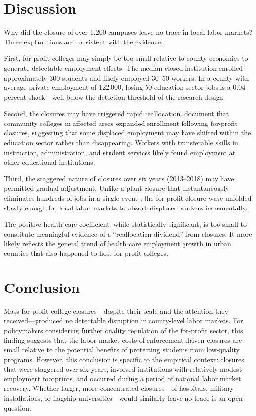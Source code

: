 \documentclass[12pt]{article}
\begin{document}
\section{Discussion}

Why did the closure of over 1,200 campuses leave no trace in local labor markets? Three explanations are consistent with the evidence.

First, for-profit colleges may simply be too small relative to county economies to generate detectable employment effects. The median closed institution enrolled approximately 300 students and likely employed 30--50 workers. In a county with average private employment of 122,000, losing 50 education-sector jobs is a 0.04 percent shock---well below the detection threshold of the research design.

Second, the closures may have triggered rapid reallocation. \citet{liu2019effect} document that community colleges in affected areas expanded enrollment following for-profit closures, suggesting that some displaced employment may have shifted within the education sector rather than disappearing. Workers with transferable skills in instruction, administration, and student services likely found employment at other educational institutions.

Third, the staggered nature of closures over six years (2013--2018) may have permitted gradual adjustment. Unlike a plant closure that instantaneously eliminates hundreds of jobs in a single event \citep{notowidigdo2020incidence}, the for-profit closure wave unfolded slowly enough for local labor markets to absorb displaced workers incrementally.

The positive health care coefficient, while statistically significant, is too small to constitute meaningful evidence of a ``reallocation dividend'' from closures. It more likely reflects the general trend of health care employment growth in urban counties that also happened to host for-profit colleges.

\section{Conclusion}

Mass for-profit college closures---despite their scale and the attention they received---produced no detectable disruption in county-level labor markets. For policymakers considering further quality regulation of the for-profit sector, this finding suggests that the labor market costs of enforcement-driven closures are small relative to the potential benefits of protecting students from low-quality programs. However, this conclusion is specific to the empirical context: closures that were staggered over six years, involved institutions with relatively modest employment footprints, and occurred during a period of national labor market recovery. Whether larger, more concentrated closures---of hospitals, military installations, or flagship universities---would similarly leave no trace is an open question.
\end{document}
